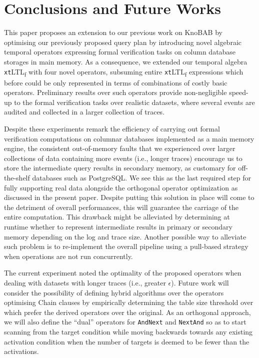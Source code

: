 \documentclass[sigconf]{acmart}
\begin{document}

\section{Conclusions and Future Works}
This paper proposes an extension to our previous work on KnoBAB by optimising our previously proposed query plan by introducing novel algebraic temporal operators expressing formal verification tasks on column database storages in main memory. As a consequence, we extended our temporal algebra \texttt{xt}LTL\textsubscript{f} with four novel operators, subsuming entire \texttt{xt}LTL\textsubscript{f} expressions which before could be only represented in terms of combinations of costly basic operators. %
Preliminary results over such operators provide non-negligible speed-up to the formal verification tasks over realistic datasets, where several events are audited and collected in a larger collection of traces.

Despite these experiments remark the efficiency of carrying out formal verification computations on columnar databases implemented as a main memory engine, the consistent out-of-memory faults that we experienced over larger collections of data containing more events (i.e., longer traces) encourage us to store the intermediate query results in secondary memory, as customary for off-the-shelf databases such as PostgreSQL. We see this as the last required step for fully supporting real data alongside the orthogonal operator optimization as discussed in the present paper. Despite putting this solution in place will come to the detriment of overall performances, this will guarantee the carriage of the entire computation. This drawback might be alleviated by determining at runtime whether to represent intermediate results in primary or secondary memory depending on the log and trace size. Another possible way to alleviate such problem is to re-implement the overall pipeline using a pull-based strategy \cite{DBLP:books/x/dittrich2016} when operations are not run concurrently. 

The current experiment noted the optimality of the proposed operators when dealing with datasets with longer traces (i.e., greater $\epsilon$). Future work will consider the possibility of defining hybrid algorithms \cite{4567924} over the operators optimising Chain clauses  by empirically determining the table size threshold over which prefer the derived operators over the original. As an orthogonal approach, we will also define the ``dual'' operators for \texttt{AndNext} and \texttt{NextAnd} so as to start scanning from the target condition while moving backwards towards any existing activation condition when the number of targets is deemed to be fewer than the activations. 
\end{document}
